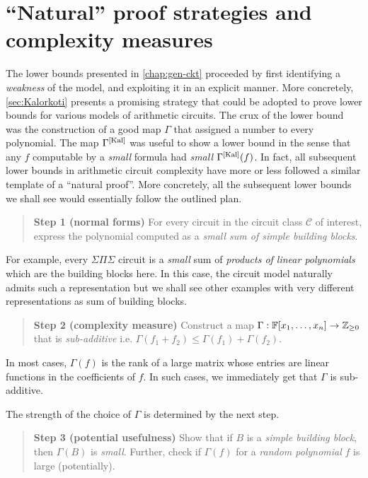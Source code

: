 \chapter{``Natural'' proof strategies and complexity measures}

The lower bounds presented in \autoref{chap:gen-ckt} proceeded by first identifying a \emph{weakness} of the model, and exploiting it in an explicit manner. 
More concretely, \autoref{sec:Kalorkoti} presents a promising strategy that could be adopted to prove lower bounds for various models of arithmetic circuits. 
The crux of the lower bound was the construction of a good map $\Gamma$ that assigned a number to every polynomial. 
The map $\Gamma^{\mathrm{[Kal]}}$ was useful to show a lower bound in the sense that any $f$ computable by a \emph{small} formula had \emph{small} $\Gamma^{\mathrm{[Kal]}}(f)$. 
In fact, all subsequent lower bounds in arithmetic circuit complexity have more or less followed a similar template of a ``natural proof''. 
More concretely, all the subsequent lower bounds we shall see would essentially follow the outlined plan.  

\begin{quote}
{\bf Step 1 (normal forms)} For every circuit in the circuit class $\mathcal{C}$ of interest, express the polynomial computed as a \emph{small sum of simple building blocks}. 
\end{quote}

For example, every $\Sigma\Pi\Sigma$ circuit is a \emph{small} sum of \emph{products of linear polynomials} which are the building blocks here. 
In this case, the circuit model naturally admits such a representation but we shall see other examples with very different representations as sum of building blocks. 

\begin{quote}
{\bf Step 2 (complexity measure)} Construct a map $\Gamma: \mathbb{F}[x_1,\dots, x_n] \rightarrow \mathbb{Z}_{\geq 0}$ that is \emph{sub-additive} i.e. $\Gamma(f_1 + f_2)\leq \Gamma(f_1) + \Gamma(f_2)$.
\end{quote}

In most cases, $\Gamma(f)$ is the rank of a large matrix whose entries are linear functions in the coefficients of $f$. 
In such cases, we immediately get that $\Gamma$ is sub-additive. 

The strength of the choice of $\Gamma$ is determined by the next step. 

\begin{quote}
{\bf Step 3 (potential usefulness)} Show that if $B$ is a \emph{simple building block}, then $\Gamma(B)$ is \emph{small}.
Further, check if $\Gamma(f)$ for a \emph{random polynomial} $f$ is large (potentially). 
\end{quote}

